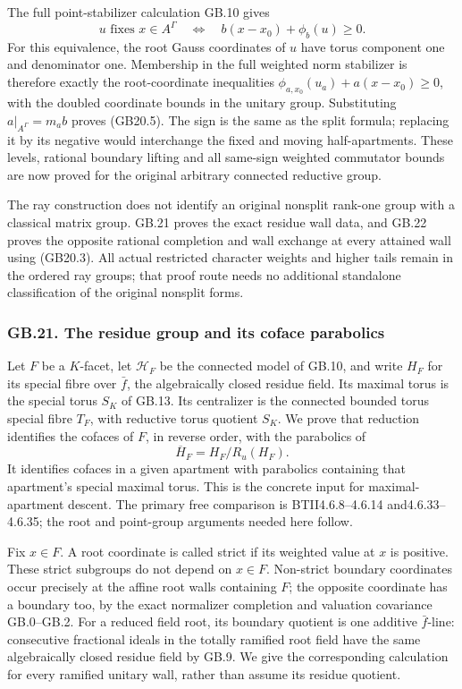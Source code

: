 \documentclass[
  11pt,
]{article}
\begin{document}
The full point-stabilizer calculation GB.10 gives \[
 u\text{ fixes }x\in A^\Gamma
     \quad\Longleftrightarrow\quad
                 b(x-x_0)+\phi_b(u)\geq0 .                  \tag{GB20.5}
\] For this equivalence, the root Gauss coordinates of \(u\) have torus
component one and denominator one. Membership in the full weighted norm
stabilizer is therefore exactly the root-coordinate inequalities
\(\phi_{a,x_0}(u_a)+a(x-x_0)\geq0\), with the doubled coordinate bounds
in the unitary group. Substituting \(a|_{A^\Gamma}=m_a b\) proves
(GB20.5). The sign is the same as the split formula; replacing it by its
negative would interchange the fixed and moving half-apartments. These
levels, rational boundary lifting and all same-sign weighted commutator
bounds are now proved for the original arbitrary connected reductive
group.

The ray construction does not identify an original nonsplit rank-one
group with a classical matrix group. GB.21 proves the exact residue wall
data, and GB.22 proves the opposite rational completion and wall
exchange at every attained wall using (GB20.3). All actual restricted
character weights and higher tails remain in the ordered ray groups;
that proof route needs no additional standalone classification of the
original nonsplit forms.

\subsubsection{GB.21. The residue group and its coface
parabolics}\label{gb.21.-the-residue-group-and-its-coface-parabolics}

Let \(F\) be a \(K\)-facet, let \(\mathcal H_F\) be the connected model
of GB.10, and write \(H_F\) for its special fibre over \(\bar f\), the
algebraically closed residue field. Its maximal torus is the special
torus \(S_K\) of GB.13. Its centralizer is the connected bounded torus
special fibre \(T_F\), with reductive torus quotient \(S_K\). We prove
that reduction identifies the cofaces of \(F\), in reverse order, with
the parabolics of \[
                              \overline H_F=H_F/R_u(H_F).
                                                               \tag{GB21.1}
\] It identifies cofaces in a given apartment with parabolics containing
that apartment's special maximal torus. This is the concrete input for
maximal-apartment descent. The primary free comparison is
BTII4.6.8--4.6.14 and4.6.33--4.6.35; the root and point-group arguments
needed here follow.

Fix \(x\in F\). A root coordinate is called strict if its weighted value
at \(x\) is positive. These strict subgroups do not depend on
\(x\in F\). Non-strict boundary coordinates occur precisely at the
affine root walls containing \(F\); the opposite coordinate has a
boundary too, by the exact normalizer completion and valuation
covariance GB.0--GB.2. For a reduced field root, its boundary quotient
is one additive \(\bar f\)-line: consecutive fractional ideals in the
totally ramified root field have the same algebraically closed residue
field by GB.9. We give the corresponding calculation for every ramified
unitary wall, rather than assume its residue quotient.
\end{document}
